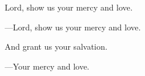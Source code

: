 \responsory

\begin{hangpar}


\medskip Lord, show us your mercy and love.

{\color{red}---\thinspace }Lord, show us your mercy and love.

\medskip And grant us your salvation.

{\color{red}---\thinspace }Your mercy and love.
\end{hangpar}